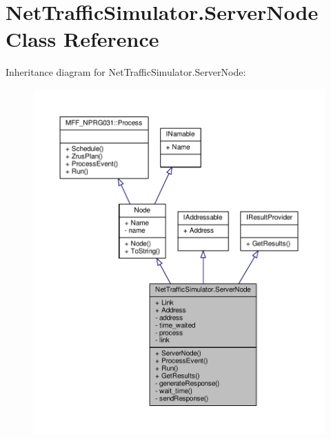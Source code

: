 \hypertarget{classNetTrafficSimulator_1_1ServerNode}{\section{Net\-Traffic\-Simulator.\-Server\-Node Class Reference}
\label{classNetTrafficSimulator_1_1ServerNode}
}


Inheritance diagram for Net\-Traffic\-Simulator.\-Server\-Node\-:
\nopagebreak
\begin{figure}[H]
\begin{center}
\leavevmode
\includegraphics[width=350pt]{classNetTrafficSimulator_1_1ServerNode__inherit__graph}
\end{center}
\end{figure}


